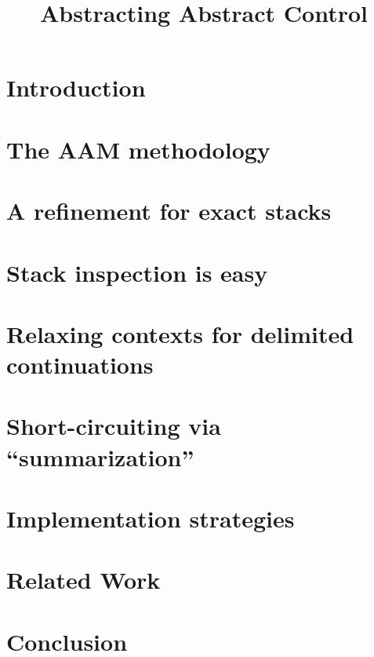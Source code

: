 \documentclass[preprint]{sigplanconf}
\title{Abstracting Abstract Control}
\begin{document}
\maketitle


\begin{abstract}

\end{abstract}

\section{Introduction}

\section{The AAM methodology}

\section{A refinement for exact stacks}

\section{Stack inspection is easy}

\section{Relaxing contexts for delimited continuations}\label{sec:delim}

\section{Short-circuiting via ``summarization''}\label{sec:memo}

\section{Implementation strategies}

\section{Related Work}

\section{Conclusion}

\balance


\end{document}
